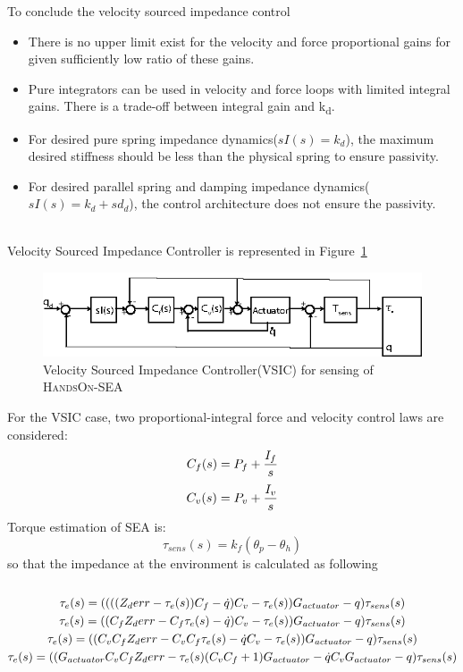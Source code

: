 \documentclass[a4paper,12pt]{article}
\begin{document}
To conclude the velocity sourced impedance control\cite{calanca}
\begin{itemize}
\item There is no upper limit exist for the velocity and force proportional gains for given sufficiently low ratio of these gains.
\item Pure integrators can be used in velocity and force loops with limited integral gains. There is a trade-off between integral gain and k\textsubscript{d}.
\item For desired pure spring impedance dynamics(\(sI(s)=k_d\)), the maximum desired stiffness should be less than the physical spring to ensure passivity.
\item For desired parallel spring and damping impedance dynamics(\(sI(s)=k_d+sd_d\)), the control architecture does not ensure the passivity\cite{tagliamonte}.
\end{itemize}\\
Velocity Sourced Impedance Controller is represented in Figure~\ref{fig:model7}
\begin{figure}[h]
\centering
\includegraphics[scale=2]{vsic.eps}
\caption{Velocity Sourced Impedance Controller(VSIC) for sensing of \textsc{HandsOn-SEA}}
\label{fig:model7}
\end{figure}
For the VSIC case, two proportional-integral force and velocity control laws are considered:
\begin{equation}
C_{f}(s)=P_{f}+\frac{I_{f}}{s} \\
\end{equation}
\begin{equation}
C_{v}(s)=P_{v}+\frac{I_{v}}{s}  \\
\end{equation}
Torque estimation of SEA is:
\begin{equation}
\tau_{sens}(s)=k_f(\theta_p-\theta_h)
\end{equation}
so that the impedance at the environment is calculated as following
\begin{equation}
\begin{multlined}\\
\tau_e(s)=((((Z_{d}err-\tau_e(s))C_{f}-\dot{q})C_{v}-\tau_e(s))G_{actuator}-q)\tau_{sens}(s) \\
\tau_e(s)=((C_{f}Z_{d}err-C_{f}\tau_e(s)-\dot{q})C_{v}-\tau_e(s))G_{actuator}-q)\tau_{sens}(s) \\
\tau_e(s)=((C_{v}C_{f}Z_{d}err-C_{v}C_{f}\tau_e(s)-\dot{q}C_{v}-\tau_e(s))G_{actuator}-q)\tau_{sens}(s) \\
\tau_e(s)=((G_{actuator}C_{v}C_{f}Z_{d}err-\tau_e(s)(C_{v}C_{f}+1)G_{actuator}-\dot{q}C_{v}G_{actuator}-q)\tau_{sens}(s) \\
\end{multlined}\\
\end{equation}
\end{document}

